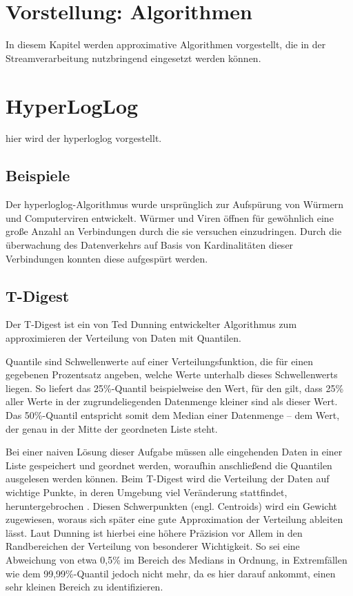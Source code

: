 \section{Vorstellung: Algorithmen}
In diesem Kapitel werden approximative Algorithmen vorgestellt, 
die in der Streamverarbeitung nutzbringend eingesetzt werden können.

\section{HyperLogLog}
hier wird der hyperloglog vorgestellt.
\subsection{Beispiele}
Der hyperloglog-Algorithmus wurde ursprünglich zur Aufspürung von Würmern und Computerviren entwickelt. 
Würmer und Viren öffnen für gewöhnlich eine große Anzahl an Verbindungen durch die sie versuchen einzudringen. 
Durch die überwachung des Datenverkehrs auf Basis von Kardinalitäten dieser Verbindungen konnten diese aufgespürt werden. \cite{flajolet2007}


\subsection{T-Digest}
Der T-Digest ist ein von Ted Dunning entwickelter Algorithmus zum approximieren der Verteilung von Daten mit Quantilen.

Quantile sind Schwellenwerte auf einer Verteilungsfunktion, die für einen gegebenen Prozentsatz angeben, welche Werte unterhalb dieses Schwellenwerts liegen.
So liefert das 25\%-Quantil beispielweise den Wert, für den gilt, dass 25\% aller Werte in der zugrundeliegenden Datenmenge kleiner sind als dieser Wert.
Das 50\%-Quantil entspricht somit dem Median einer Datenmenge -- dem Wert, der genau in der Mitte der geordneten Liste steht.

Bei einer naiven Lösung dieser Aufgabe müssen alle eingehenden Daten in einer Liste gespeichert und geordnet werden, woraufhin anschließend die Quantilen ausgelesen werden können.
Beim T-Digest wird die Verteilung der Daten auf wichtige Punkte, in deren Umgebung viel Veränderung stattfindet, heruntergebrochen \cite{davidsonpilon2015}.
Diesen Schwerpunkten (engl. Centroids) wird ein Gewicht zugewiesen, woraus sich später eine gute Approximation der Verteilung ableiten lässt.
Laut Dunning \cite{dunning2015} ist hierbei eine höhere Präzision vor Allem in den Randbereichen der Verteilung von besonderer Wichtigkeit.
So sei eine Abweichung von etwa 0,5\% im Bereich des Medians in Ordnung, in Extremfällen wie dem 99,99\%-Quantil jedoch nicht mehr, da es hier darauf ankommt, einen sehr kleinen Bereich zu identifizieren.

